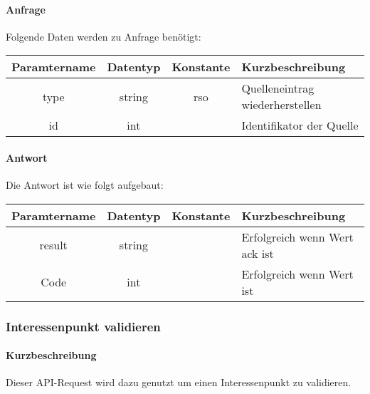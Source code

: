 \paragraph{Anfrage}Folgende Daten werden zu Anfrage benötigt:
\begin{table}[H]
	\begin{tabular}{|c|c|c|p{6.5cm}|}
		\hline
		\textbf{Paramtername} & \textbf{Datentyp} & \textbf{Konstante} & \textbf{Kurzbeschreibung}                                                                                               \\ \hline
		type                & string            & rso                & Quelleneintrag wiederherstellen \\ \hline
		id                  & int               &                    & Identifikator der Quelle \\ \hline
	\end{tabular}
\end{table}
\paragraph{Antwort}Die Antwort ist wie folgt aufgebaut:
\begin{table}[H]
	\begin{tabular}{|c|c|c|p{6.5cm}|}
		\hline
		\textbf{Paramtername} & \textbf{Datentyp} & \textbf{Konstante} & \textbf{Kurzbeschreibung}                                                                                               \\ \hline
		result              & string           &                 & Erfolgreich wenn Wert {\glqq ack\grqq} ist \\ \hline
		Code                & int              &                 & Erfolgreich wenn Wert {\glqq 0\grqq} ist \\ \hline
	\end{tabular}
\end{table}
\subsubsection{Interessenpunkt validieren}
\paragraph{Kurzbeschreibung}Dieser API-Request wird dazu genutzt um einen Interessenpunkt zu validieren.

